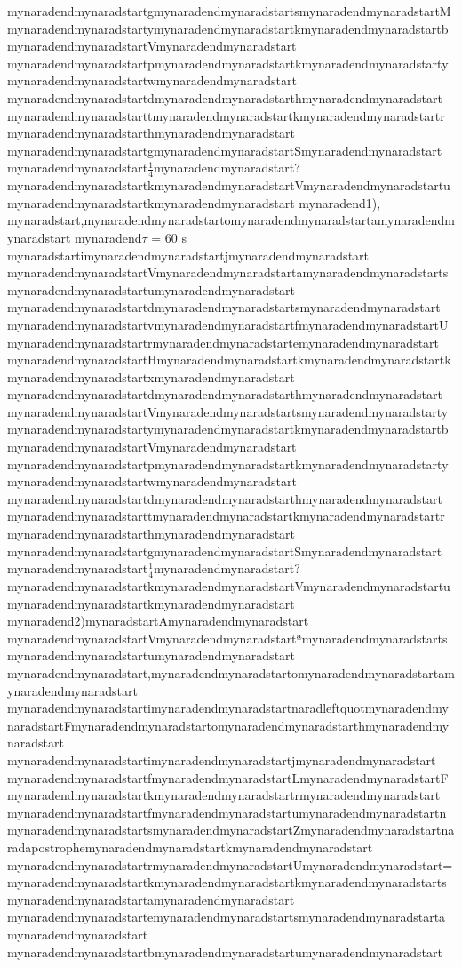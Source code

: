 \documentclass{scrbook}
\begin{document}
mynaradendmynaradstartgmynaradendmynaradstartsmynaradendmynaradstartMmynaradendmynaradstartymynaradendmynaradstartkmynaradendmynaradstartbmynaradendmynaradstartVmynaradendmynaradstart mynaradendmynaradstartpmynaradendmynaradstartkmynaradendmynaradstartymynaradendmynaradstartwmynaradendmynaradstart mynaradendmynaradstartdmynaradendmynaradstarthmynaradendmynaradstart mynaradendmynaradstarttmynaradendmynaradstartkmynaradendmynaradstartrmynaradendmynaradstarthmynaradendmynaradstart mynaradendmynaradstartgmynaradendmynaradstartSmynaradendmynaradstart mynaradendmynaradstart$\frac{1}{4}$mynaradendmynaradstart?mynaradendmynaradstartkmynaradendmynaradstartVmynaradendmynaradstartumynaradendmynaradstartkmynaradendmynaradstart mynaradend1), mynaradstart,mynaradendmynaradstartomynaradendmynaradstartamynaradendmynaradstart mynaradend${\tau}$ = 60 s mynaradstartimynaradendmynaradstartjmynaradendmynaradstart mynaradendmynaradstartVmynaradendmynaradstartamynaradendmynaradstartsmynaradendmynaradstartumynaradendmynaradstart mynaradendmynaradstartdmynaradendmynaradstartsmynaradendmynaradstart mynaradendmynaradstartvmynaradendmynaradstartfmynaradendmynaradstartUmynaradendmynaradstartrmynaradendmynaradstartemynaradendmynaradstart mynaradendmynaradstartHmynaradendmynaradstartkmynaradendmynaradstartkmynaradendmynaradstartxmynaradendmynaradstart mynaradendmynaradstartdmynaradendmynaradstarthmynaradendmynaradstart mynaradendmynaradstartVmynaradendmynaradstartsmynaradendmynaradstartymynaradendmynaradstartymynaradendmynaradstartkmynaradendmynaradstartbmynaradendmynaradstartVmynaradendmynaradstart mynaradendmynaradstartpmynaradendmynaradstartkmynaradendmynaradstartymynaradendmynaradstartwmynaradendmynaradstart mynaradendmynaradstartdmynaradendmynaradstarthmynaradendmynaradstart mynaradendmynaradstarttmynaradendmynaradstartkmynaradendmynaradstartrmynaradendmynaradstarthmynaradendmynaradstart mynaradendmynaradstartgmynaradendmynaradstartSmynaradendmynaradstart mynaradendmynaradstart$\frac{1}{4}$mynaradendmynaradstart?mynaradendmynaradstartkmynaradendmynaradstartVmynaradendmynaradstartumynaradendmynaradstartkmynaradendmynaradstart mynaradend2)mynaradstartAmynaradendmynaradstart mynaradendmynaradstartVmynaradendmynaradstartªmynaradendmynaradstartsmynaradendmynaradstartumynaradendmynaradstart mynaradendmynaradstart,mynaradendmynaradstartomynaradendmynaradstartamynaradendmynaradstart mynaradendmynaradstartimynaradendmynaradstartnaradleftquotmynaradendmynaradstartFmynaradendmynaradstartomynaradendmynaradstarthmynaradendmynaradstart mynaradendmynaradstartimynaradendmynaradstartjmynaradendmynaradstart mynaradendmynaradstartfmynaradendmynaradstartLmynaradendmynaradstartFmynaradendmynaradstartkmynaradendmynaradstartrmynaradendmynaradstart mynaradendmynaradstartfmynaradendmynaradstartumynaradendmynaradstartnmynaradendmynaradstartsmynaradendmynaradstartZmynaradendmynaradstartnaradapostrophemynaradendmynaradstartkmynaradendmynaradstart mynaradendmynaradstartrmynaradendmynaradstartUmynaradendmynaradstart=mynaradendmynaradstartkmynaradendmynaradstartkmynaradendmynaradstartsmynaradendmynaradstartamynaradendmynaradstart mynaradendmynaradstartemynaradendmynaradstartsmynaradendmynaradstartamynaradendmynaradstart mynaradendmynaradstartbmynaradendmynaradstartumynaradendmynaradstart 
\end{document}
